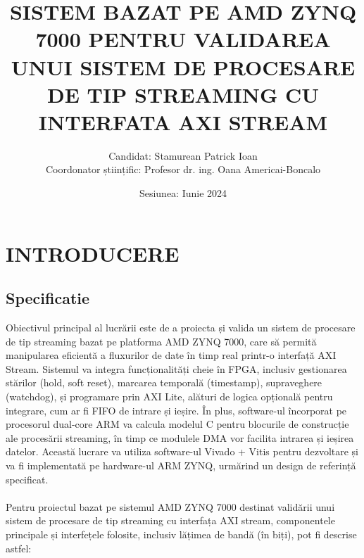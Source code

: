 \documentclass[12pt]{article}
\title{\uppercase{\bfseries{Sistem bazat pe AMD ZYNQ 7000 pentru validarea unui sistem de procesare de tip streaming cu interfata AXI stream}}}
\author{Candidat: Stamurean Patrick Ioan\\Coordonator științific: Profesor dr. ing. Oana Americai-Boncalo}
\date{Sesiunea: Iunie 2024}
\begin{document}
\maketitle



\newpage
\renewcommand{\contentsname}{Cuprins}
\tableofcontents



\newpage
\section{\uppercase{Introducere}}
\subsection{Specificatie}
Obiectivul principal al lucrării este de a proiecta și valida un sistem de procesare de tip streaming bazat pe platforma AMD ZYNQ 7000, care să permită manipularea eficientă a fluxurilor de date în timp real printr-o interfață AXI Stream. Sistemul va integra funcționalități cheie în FPGA, inclusiv gestionarea stărilor (hold, soft reset), marcarea temporală (timestamp), supraveghere (watchdog), și programare prin AXI Lite, alături de logica opțională pentru integrare, cum ar fi FIFO de intrare și ieșire. În plus, software-ul încorporat pe procesorul dual-core ARM va calcula modelul C pentru blocurile de construcție ale procesării streaming, în timp ce modulele DMA vor facilita intrarea și ieșirea datelor. Această lucrare va utiliza software-ul Vivado + Vitis pentru dezvoltare și va fi implementată pe hardware-ul ARM ZYNQ, urmărind un design de referință specificat.\\\\
Pentru proiectul bazat pe sistemul AMD ZYNQ 7000 destinat validării unui sistem de procesare de tip streaming cu interfața AXI stream, componentele principale și interfețele folosite, inclusiv lățimea de bandă (în biți), pot fi descrise astfel:
\end{document}
